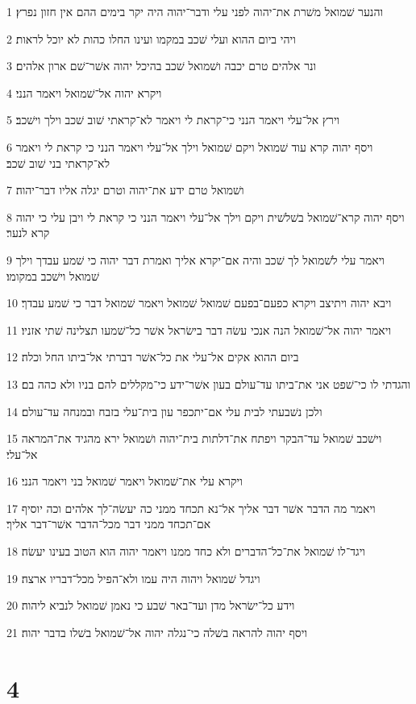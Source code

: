\par 1 והנער שׁמואל משׁרת את־יהוה לפני עלי ודבר־יהוה היה יקר בימים ההם אין חזון נפרץ׃
\par 2 ויהי ביום ההוא ועלי שׁכב במקמו ועינו החלו כהות לא יוכל לראות׃
\par 3 ונר אלהים טרם יכבה ושׁמואל שׁכב בהיכל יהוה אשׁר־שׁם ארון אלהים׃
\par 4 ויקרא יהוה אל־שׁמואל ויאמר הנני׃
\par 5 וירץ אל־עלי ויאמר הנני כי־קראת לי ויאמר לא־קראתי שׁוב שׁכב וילך וישׁכב׃
\par 6 ויסף יהוה קרא עוד שׁמואל ויקם שׁמואל וילך אל־עלי ויאמר הנני כי קראת לי ויאמר לא־קראתי בני שׁוב שׁכב׃
\par 7 ושׁמואל טרם ידע את־יהוה וטרם יגלה אליו דבר־יהוה׃
\par 8 ויסף יהוה קרא־שׁמואל בשׁלשׁית ויקם וילך אל־עלי ויאמר הנני כי קראת לי ויבן עלי כי יהוה קרא לנער׃
\par 9 ויאמר עלי לשׁמואל לך שׁכב והיה אם־יקרא אליך ואמרת דבר יהוה כי שׁמע עבדך וילך שׁמואל וישׁכב במקומו׃
\par 10 ויבא יהוה ויתיצב ויקרא כפעם־בפעם שׁמואל שׁמואל ויאמר שׁמואל דבר כי שׁמע עבדך׃
\par 11 ויאמר יהוה אל־שׁמואל הנה אנכי עשׂה דבר בישׂראל אשׁר כל־שׁמעו תצלינה שׁתי אזניו׃
\par 12 ביום ההוא אקים אל־עלי את כל־אשׁר דברתי אל־ביתו החל וכלה׃
\par 13 והגדתי לו כי־שׁפט אני את־ביתו עד־עולם בעון אשׁר־ידע כי־מקללים להם בניו ולא כהה בם׃
\par 14 ולכן נשׁבעתי לבית עלי אם־יתכפר עון בית־עלי בזבח ובמנחה עד־עולם׃
\par 15 וישׁכב שׁמואל עד־הבקר ויפתח את־דלתות בית־יהוה ושׁמואל ירא מהגיד את־המראה אל־עלי׃
\par 16 ויקרא עלי את־שׁמואל ויאמר שׁמואל בני ויאמר הנני׃
\par 17 ויאמר מה הדבר אשׁר דבר אליך אל־נא תכחד ממני כה יעשׂה־לך אלהים וכה יוסיף אם־תכחד ממני דבר מכל־הדבר אשׁר־דבר אליך׃
\par 18 ויגד־לו שׁמואל את־כל־הדברים ולא כחד ממנו ויאמר יהוה הוא הטוב בעינו יעשׂה׃
\par 19 ויגדל שׁמואל ויהוה היה עמו ולא־הפיל מכל־דבריו ארצה׃
\par 20 וידע כל־ישׂראל מדן ועד־באר שׁבע כי נאמן שׁמואל לנביא ליהוה׃
\par 21 ויסף יהוה להראה בשׁלה כי־נגלה יהוה אל־שׁמואל בשׁלו בדבר יהוה׃

\chapter{4}

